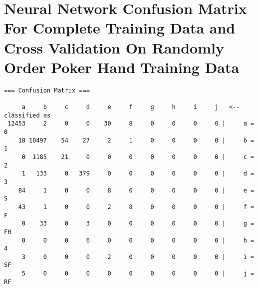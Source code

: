 \documentclass[11pt, a4paper]{article}
\begin{document}
\section{Neural Network Confusion Matrix For Complete Training Data and Cross Validation On Randomly Order Poker Hand Training Data}

\begin{verbatim}
=== Confusion Matrix ===

     a     b     c     d     e     f     g     h     i     j   <-- classified as
 12453     2     0     0    30     8     0     0     0     0 |     a = 0
    18 10497    54    27     2     1     0     0     0     0 |     b = 1
     0  1185    21     0     0     0     0     0     0     0 |     c = 2
     1   133     0   379     0     0     0     0     0     0 |     d = 3
    84     1     0     0     8     0     0     0     0     0 |     e = S
    43     1     0     0     2     8     0     0     0     0 |     f = F
     0    33     0     3     0     0     0     0     0     0 |     g = FH
     0     0     0     6     0     0     0     0     0     0 |     h = 4
     3     0     0     0     2     0     0     0     0     0 |     i = SF
     5     0     0     0     0     0     0     0     0     0 |     j = RF
\end{verbatim}
\end{document}
